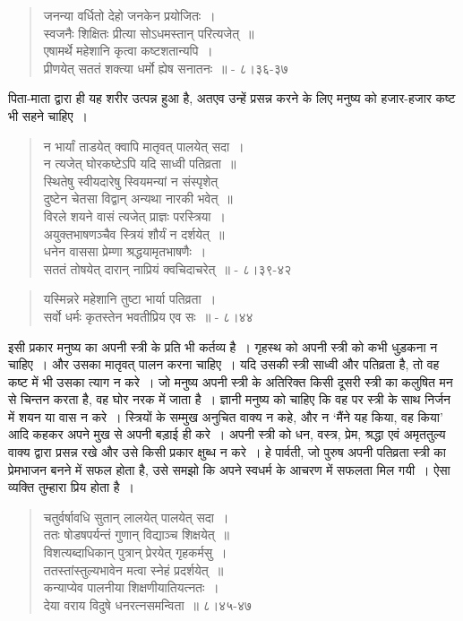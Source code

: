 \begin{verse}
जनन्या वर्धितो देहो जनकेन प्रयोजितः~।\\ स्वजनैः शिक्षितः प्रीत्या सोऽधमस्तान् परित्यजेत्~॥ \\ एषामर्थे महेशानि कृत्वा कष्टशतान्यपि~।\\ प्रीणयेत् सततं शक्त्या धर्मो ह्येष सनातनः~॥ - ८।३६-३७
\end{verse}

पिता-माता द्वारा ही यह शरीर उत्पन्न हुआ है, अतएव उन्हें प्रसन्न करने के लिए मनुष्य को हजार-हजार कष्ट भी सहने चाहिए~।

\begin{verse}
न भार्यां ताडयेत् क्वापि मातृवत् पालयेत् सदा~।\\ न त्यजेत् घोरकष्टेऽपि यदि साध्वी पतिव्रता~॥\\ स्थितेषु स्वीयदारेषु स्वियमन्यां न संस्पृशेत् \\ दुष्टेन चेतसा विद्वान् अन्यथा नारकी भवेत्~॥\\ विरले शयने वासं त्यजेत् प्राज्ञः परस्त्रिया~।\\ अयुक्तभाषणञ्चैव स्त्रियं शौर्यं न दर्शयेत्~॥\\ धनेन वाससा प्रेम्णा श्रद्धयामृतभाषणैः~।\\ सततं तोषयेत् दारान् नाप्रियं क्वचिदाचरेत्~॥ - ८।३९-४२
\end{verse}

\delimiter

\begin{verse}
यस्मिन्नरे महेशानि तुष्टा भार्या पतिव्रता~।\\ सर्वो धर्मः कृतस्तेन भवतीप्रिय एव सः~॥ - ८।४४
\end{verse}

इसी प्रकार मनुष्य का अपनी स्त्री के प्रति भी कर्तव्य है~। गृहस्थ को अपनी स्त्री को कभी धुड़कना न चाहिए~। और उसका मातृवत् पालन करना चाहिए~। यदि उसकी स्त्री साध्वी और पतिव्रता है, तो वह कष्ट में भी उसका त्याग न करे~। जो मनुष्य अपनी स्त्री के अतिरिक्त किसी दूसरी स्त्री का कलुषित मन से चिन्तन करता है, वह घोर नरक में जाता है~। ज्ञानी मनुष्य को चाहिए कि वह पर स्त्री के साथ निर्जन में शयन या वास न करे~। स्त्रियों के सम्मुख अनुचित वाक्य न कहे, और न ‘मैंने यह किया, वह किया’ आदि कहकर अपने मुख से अपनी बड़ाई ही करे~। अपनी स्त्री को धन, वस्त्र, प्रेम, श्रद्धा एवं अमृततुल्य वाक्य द्वारा प्रसन्न रखे और उसे किसी प्रकार क्षुब्ध न करे~। हे पार्वती, जो पुरुष अपनी पतिव्रता स्त्री का प्रेमभाजन बनने में सफल होता है, उसे समझो कि अपने स्वधर्म के आचरण में सफलता मिल गयी~। ऐसा व्यक्ति तुम्हारा प्रिय होता है~।

\begin{verse}
चतुर्वर्षावधि सुतान् लालयेत् पालयेत् सदा~।\\ ततः षोडषपर्यन्तं गुणान् विद्याञ्च शिक्षयेत्~॥\\ विशत्यब्दाधिकान् पुत्रान् प्रेरयेत् गृहकर्मसु~।\\ ततस्तांस्तुल्यभावेन मत्वा स्नेहं प्रदर्शयेत्~॥\\ कन्याप्येव पालनीया शिक्षणीयातियत्नतः~।\\ देया वराय विदुषे धनरत्नसमन्विता~॥ ८।४५-४७
\end{verse}

